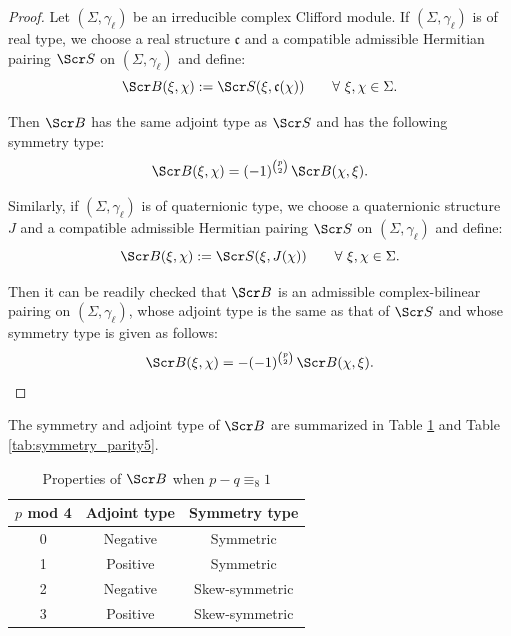 \documentclass[10pt,a4paper,twoside,reqno]{amsart}
\theoremstyle{plain}
\theoremstyle{definition}
\theoremstyle{remark}
\def\scB{\Scr B}
\def\scS{\Scr S}
\def\frc{\mathfrak{F}}
\def\frc{\mathfrak{c}}
\begin{document}
\begin{proof}
Let $(\Sigma,\gamma_\ell)$ be an irreducible complex Clifford module. If $(\Sigma,\gamma_\ell)$ is of real type, we choose a real structure $\frc$ and a compatible admissible Hermitian pairing $\scS$ on $(\Sigma,\gamma_\ell)$ and define:
\begin{equation*}
\scB(\xi,\chi) := \scS(\xi,\frc(\chi)) \qquad \forall\,\, \xi, \chi \in \Sigma.
\end{equation*}

\noindent
Then $\scB$ has the same adjoint type as $\scS$ and has the following symmetry type:
\begin{equation*}
\scB(\xi,\chi) = (-1)^{\binom{p}{2}}\, \scB(\chi,\xi).
\end{equation*}

\noindent
Similarly, if $(\Sigma,\gamma_\ell)$ is of quaternionic type, we choose a quaternionic structure $J$ and a compatible admissible Hermitian pairing $\scS$ on $(\Sigma,\gamma_\ell)$ and define:
\begin{equation*}
\scB(\xi,\chi) := \scS(\xi,J(\chi)) \qquad \forall\,\, \xi, \chi \in \Sigma.
\end{equation*}

\noindent
Then it can be readily checked that $\scB$ is an admissible complex-bilinear pairing on $(\Sigma,\gamma_\ell)$, whose adjoint type is the same as that of $\scS$ and whose symmetry type is given as follows:
\begin{equation*}
\scB(\xi,\chi)  =  - (-1)^{\binom{p}{2}}\, \scB(\chi,\xi).
\end{equation*}
\end{proof}

\noindent
The symmetry and adjoint type of $\scB$ are summarized in Table \ref{tab:symmetry_parity1} and Table \ref{tab:symmetry_parity5}.\medskip

\begin{table}
\centering
\caption{Properties of $\scB$ when $p-q\equiv_8 1$}
\label{tab:symmetry_parity1}
\renewcommand{\arraystretch}{1.3} %
\begin{tabular}{|c|c|c|}
\hline
\textbf{$p$ mod 4} & \textbf{Adjoint type} & \textbf{Symmetry type} \\ \hline
0 & Negative & Symmetric \\ \hline
1 & Positive & Symmetric \\ \hline
2 & Negative & Skew-symmetric \\ \hline
3 & Positive & Skew-symmetric \\ \hline
\end{tabular}
\end{table}
\end{document}
